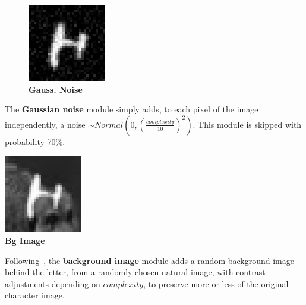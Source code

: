 \documentclass{article} %
\begin{document}
\begin{minipage}[t]{\linewidth}
\begin{figure}
\begin{center}
\vspace*{-5mm}
\includegraphics[scale=.4]{images/Distorsiongauss_only.png}\\
{\small \bf Gauss. Noise}
\end{center}
\end{figure}
\vspace*{12mm}
The {\bf Gaussian noise} module simply adds, to each pixel of the image independently, a
noise $\sim Normal(0,(\frac{complexity}{10})^2)$.
This module is skipped with probability 70\%.
\end{minipage}

\vspace*{1.2cm}

\begin{minipage}[t]{\linewidth}
\begin{minipage}[t]{0.14\linewidth}
\centering
\includegraphics[scale=.4]{images/background_other_only.png}\\
{\small \bf Bg Image}
\end{minipage}%
\hspace{0.3cm}\begin{minipage}[t]{0.83\linewidth}
\vspace*{-18mm}
Following~\citet{Larochelle-jmlr-2009}, the {\bf background image} module adds a random
background image behind the letter, from a randomly chosen natural image,
with contrast adjustments depending on $complexity$, to preserve
more or less of the original character image.
\end{minipage}
\end{minipage}
\end{document}
